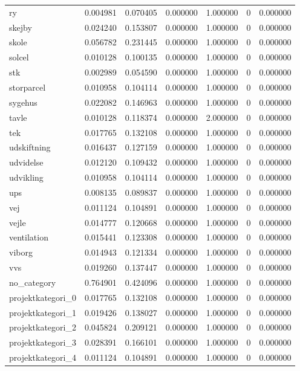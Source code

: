 \begin{landscape}
\begin{longtable}[h!]{lrrllrr}
ry & 0.004981 & 0.070405 & 0.000000 & 1.000000 & 0 & 0.000000 \\
skejby & 0.024240 & 0.153807 & 0.000000 & 1.000000 & 0 & 0.000000 \\
skole & 0.056782 & 0.231445 & 0.000000 & 1.000000 & 0 & 0.000000 \\
solcel & 0.010128 & 0.100135 & 0.000000 & 1.000000 & 0 & 0.000000 \\
stk & 0.002989 & 0.054590 & 0.000000 & 1.000000 & 0 & 0.000000 \\
storparcel & 0.010958 & 0.104114 & 0.000000 & 1.000000 & 0 & 0.000000 \\
sygehus & 0.022082 & 0.146963 & 0.000000 & 1.000000 & 0 & 0.000000 \\
tavle & 0.010128 & 0.118374 & 0.000000 & 2.000000 & 0 & 0.000000 \\
tek & 0.017765 & 0.132108 & 0.000000 & 1.000000 & 0 & 0.000000 \\
udskiftning & 0.016437 & 0.127159 & 0.000000 & 1.000000 & 0 & 0.000000 \\
udvidelse & 0.012120 & 0.109432 & 0.000000 & 1.000000 & 0 & 0.000000 \\
udvikling & 0.010958 & 0.104114 & 0.000000 & 1.000000 & 0 & 0.000000 \\
ups & 0.008135 & 0.089837 & 0.000000 & 1.000000 & 0 & 0.000000 \\
vej & 0.011124 & 0.104891 & 0.000000 & 1.000000 & 0 & 0.000000 \\
vejle & 0.014777 & 0.120668 & 0.000000 & 1.000000 & 0 & 0.000000 \\
ventilation & 0.015441 & 0.123308 & 0.000000 & 1.000000 & 0 & 0.000000 \\
viborg & 0.014943 & 0.121334 & 0.000000 & 1.000000 & 0 & 0.000000 \\
vvs & 0.019260 & 0.137447 & 0.000000 & 1.000000 & 0 & 0.000000 \\
no_category & 0.764901 & 0.424096 & 0.000000 & 1.000000 & 0 & 0.000000 \\
projektkategori_0 & 0.017765 & 0.132108 & 0.000000 & 1.000000 & 0 & 0.000000 \\
projektkategori_1 & 0.019426 & 0.138027 & 0.000000 & 1.000000 & 0 & 0.000000 \\
projektkategori_2 & 0.045824 & 0.209121 & 0.000000 & 1.000000 & 0 & 0.000000 \\
projektkategori_3 & 0.028391 & 0.166101 & 0.000000 & 1.000000 & 0 & 0.000000 \\
projektkategori_4 & 0.011124 & 0.104891 & 0.000000 & 1.000000 & 0 & 0.000000 \\

\end{longtable}
\end{landscape}
